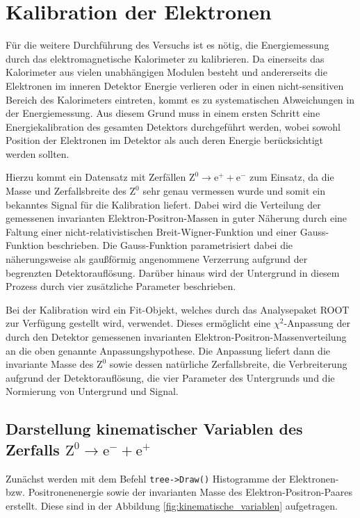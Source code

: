 \documentclass[11pt, a4paper]{article}
\numberwithin{equation}{section}
\begin{document}
\section{Kalibration der Elektronen}
\label{sec:kalibration}

Für die weitere Durchführung des Versuchs ist es nötig, die Energiemessung durch das elektromagnetische Kalorimeter zu kalibrieren.
Da einerseits das Kalorimeter aus vielen unabhängigen Modulen besteht und andererseits die Elektronen im inneren Detektor Energie verlieren oder in einen nicht-sensitiven Bereich des Kalorimeters eintreten, kommt es zu systematischen Abweichungen in der Energiemessung.
Aus diesem Grund muss in einem ersten Schritt eine Energiekalibration des gesamten Detektors durchgeführt werden, wobei sowohl Position der Elektronen im Detektor als auch deren Energie berücksichtigt werden sollten.

Hierzu kommt ein Datensatz mit Zerfällen $\mathrm{Z}^0 \rightarrow \mathrm{e}^+ + \mathrm{e}^-$ zum Einsatz, da die Masse und Zerfallsbreite des $\mathrm{Z}^0$ sehr genau vermessen wurde und somit ein bekanntes Signal für die Kalibration liefert.
Dabei wird die Verteilung der gemessenen invarianten Elektron-Positron-Massen in guter Näherung durch eine Faltung einer nicht-relativistischen Breit-Wigner-Funktion und einer Gauss-Funktion beschrieben.
Die Gauss-Funktion parametrisiert dabei die näherungsweise als gaußförmig angenommene Verzerrung aufgrund der begrenzten Detektorauflösung.
Darüber hinaus wird der Untergrund in diesem Prozess durch vier zusätzliche Parameter beschrieben.

Bei der Kalibration wird ein Fit-Objekt, welches durch das Analysepaket ROOT zur Verfügung gestellt wird, verwendet.
Dieses ermöglicht eine $\chi^2$-Anpassung der durch den Detektor gemessenen invarianten  Elektron-Positron-Massenverteilung an die oben genannte Anpassungshypothese.
Die Anpassung liefert dann die invariante Masse des $\mathrm{Z}^0$ sowie dessen natürliche Zerfallsbreite, die Verbreiterung aufgrund der Detektorauflösung, die vier Parameter des Untergrunds und die Normierung von Untergrund und Signal.

\subsection{Darstellung kinematischer Variablen des Zerfalls $\mathrm{Z}^0 \rightarrow \mathrm{e}^- + \mathrm{e}^+$}

Zunächst werden mit dem Befehl \texttt{tree->Draw()} Histogramme der Elektronen- bzw. Positronenenergie sowie der invarianten Masse des Elektron-Positron-Paares erstellt.
Diese sind in der Abbildung \ref{fig:kinematische_variablen} aufgetragen.
\end{document}
